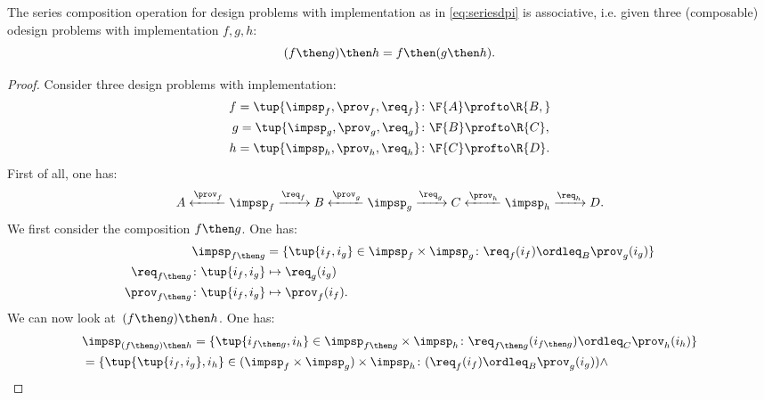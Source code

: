\begin{lemma}
  The series composition operation for design problems with implementation as in \cref{eq:seriesdpi} is associative, i.e. given three (composable) odesign problems with implementation $f,g,h$:
  \begin{equation}
  (f\then g)
    \then h = f\then (g\then h).
  \end{equation}
\end{lemma}
\begin{proof}
  Consider three design problems with implementation:
  \begin{equation}
    \begin{aligned}
      f=\tup{{\impsp_f, \prov_f, \req_f} }&\colon \F{A} \profto\R{B,}\\
      g=\tup{\impsp_g, \prov_g, \req_g}&\colon \F{B} \profto \R{C},\\
      h=\tup{\impsp_h, \prov_h, \req_h}&\colon \F{C} \profto \R{D}.
    \end{aligned}
  \end{equation}
  First of all, one has:
  \begin{equation}
    A \xleftarrow{\prov_f} \impsp_f \xrightarrow{\req_f} B
    \xleftarrow{\prov_g} \impsp_g \xrightarrow{\req_g} C
    \xleftarrow{\prov_h} \impsp_h \xrightarrow{\req_h} D.
  \end{equation}
  We first consider the composition $f\then g$. One has:
  \begin{equation}
    \begin{aligned}
      \impsp_{f\then g} &= \{
      \tup{i_f,i_g} \in \impsp_f \times \impsp_g \colon
      \req_f(i_f) \ordleq_{B} \prov_g(i_g)
      \}\\
      \req_{f\then g}  \colon  \tup{i_f,i_g} &\mapsto \req_g(i_g) \\
      \prov_{f\then g}  \colon  \tup{i_f,i_g} &\mapsto \prov_f(i_f).
    \end{aligned}
  \end{equation}
  We can now look at~$(f\then g)\then h$. One has:
  \begin{equation}
    \begin{aligned}
      &\impsp_{(f\then g)\then h} = \{
      \tup{i_{f\then g},i_h} \in \impsp_{f\then g} \times \impsp_{h}\colon
      \req_{f\then g}(i_{f\then g}) \ordleq_{C} \prov_h(i_h)
      \}\\
      &=\{
      \tup{\tup{i_f, i_g},i_h} \in (\impsp_f \times \impsp_g) \times \impsp_{h}\colon
      (\req_f(i_f) \ordleq_{B} \prov_g(i_g))
      \wedge

\end{aligned}
\end{equation}
\end{proof}
